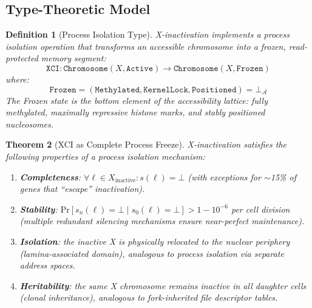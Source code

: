 \documentclass[12pt,a4paper]{article}
\newtheorem{theorem}{Theorem}[section]
\newtheorem{definition}[theorem]{Definition}
\newcommand{\Meth}{\texttt{Methylated}}
\begin{document}
\subsection{Type-Theoretic Model}

\begin{definition}[Process Isolation Type]
\label{def:proc-iso}
X-inactivation implements a \emph{process isolation} operation that transforms an accessible chromosome into a frozen, read-protected memory segment:
\[
    \texttt{XCI} : \texttt{Chromosome}(X, \texttt{Active}) \to \texttt{Chromosome}(X, \texttt{Frozen})
\]
where:
\[
    \texttt{Frozen} = (\Meth, \texttt{KernelLock}, \texttt{Positioned}) = \bot_{\mathcal{A}}
\]
The Frozen state is the bottom element of the accessibility lattice: fully methylated, maximally repressive histone marks, and stably positioned nucleosomes.
\end{definition}

\begin{theorem}[XCI as Complete Process Freeze]
\label{thm:xci-freeze}
X-inactivation satisfies the following properties of a process isolation mechanism:
\begin{enumerate}[label=(\roman*)]
    \item \textbf{Completeness}: $\forall \ell \in X_{\mathrm{inactive}} : s(\ell) = \bot$ (with exceptions for $\sim$15\% of genes that ``escape'' inactivation).
    \item \textbf{Stability}: $\mathrm{Pr}[s_n(\ell) = \bot \mid s_0(\ell) = \bot] > 1 - 10^{-6}$ per cell division (multiple redundant silencing mechanisms ensure near-perfect maintenance).
    \item \textbf{Isolation}: the inactive X is physically relocated to the nuclear periphery (lamina-associated domain), analogous to process isolation via separate address spaces.
    \item \textbf{Heritability}: the same X chromosome remains inactive in all daughter cells (clonal inheritance), analogous to fork-inherited file descriptor tables.
\end{enumerate}
\end{theorem}
\end{document}
